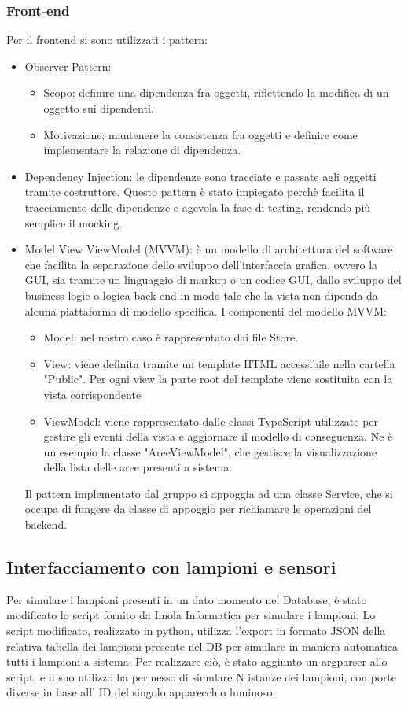 \documentclass[12pt]{article}
\begin{document}
\subsubsection{Front-end}
Per il frontend si sono utilizzati i pattern:
\begin{itemize}
	\item Observer Pattern:
	\begin{itemize}
		\item Scopo: definire una dipendenza fra oggetti, riflettendo la modifica di un oggetto sui dipendenti.
		\item Motivazione: mantenere la consistenza fra oggetti e definire come implementare la relazione di dipendenza.
	\end{itemize}
	\item Dependency Injection: le dipendenze sono tracciate e passate agli oggetti tramite costruttore.
	 Questo pattern è stato impiegato perchè facilita il tracciamento delle dipendenze e agevola la fase di testing, rendendo più semplice il mocking.
	\item Model View ViewModel (MVVM): è un modello di architettura del software che facilita la separazione dello sviluppo dell'interfaccia grafica, ovvero la GUI,
sia tramite un linguaggio di markup o un codice GUI, dallo sviluppo del business logic o logica back-end in modo tale che la vista non dipenda da alcuna piattaforma di modello specifica.
I componenti del modello MVVM:	
	\begin{itemize}
		\item Model: nel nostro caso è rappresentato dai file Store.
		\item View: viene definita tramite un template HTML accessibile nella cartella "Public". Per ogni view la parte root del template viene sostituita con la vista corrispondente
		\item ViewModel: viene rappresentato dalle classi TypeScript utilizzate per gestire gli eventi della vista e aggiornare il modello di conseguenza. Ne è un esempio la classe "AreeViewModel", che gestisce la visualizzazione della lista delle aree presenti a sistema.
	\end{itemize}
Il pattern implementato dal gruppo si appoggia ad una classe Service, che si occupa di fungere da classe di appoggio per richiamare le operazioni del backend.

\end{itemize}
\subsection{Interfacciamento con lampioni e sensori}
Per simulare i lampioni presenti in un dato momento nel Database, è stato modificato lo script fornito da Imola Informatica per simulare i lampioni.
Lo script modificato, realizzato in python, utilizza l'export in formato JSON della relativa tabella dei lampioni presente nel DB per simulare in maniera automatica tutti i lampioni a sistema.
Per realizzare ciò, è stato aggiunto un argparser allo script, e il suo utilizzo ha permesso di simulare N istanze dei lampioni, con porte diverse in base all' ID del singolo apparecchio luminoso.
\end{document}
